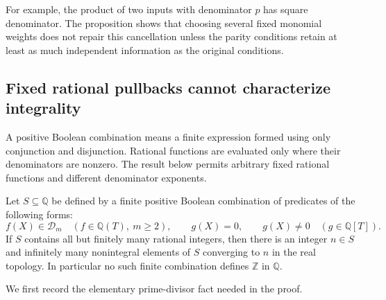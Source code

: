 For example, the product of two inputs with denominator $p$ has square
denominator.  The proposition shows that choosing several fixed
monomial weights does not repair this cancellation unless the parity
conditions retain at least as much independent information as the
original conditions.

\subsection{Fixed rational pullbacks cannot characterize integrality}

A positive Boolean combination means a finite expression formed using
only conjunction and disjunction.  Rational functions are evaluated
only where their denominators are nonzero.  The result below permits
arbitrary fixed rational functions and different denominator exponents.

\begin{theorem}\label{thm:finite-denominator-tests}
Let $S\subseteq\mathbb Q$ be defined by a finite positive Boolean
combination of predicates of the following forms:
\[
 f(X)\in\mathcal D_m\quad(f\in\mathbb Q(T),\ m\ge2),
 \qquad g(X)=0,\qquad g(X)\ne0
 \quad(g\in\mathbb Q[T]).
\]
If $S$ contains all but finitely many rational integers, then there is
an integer $n\in S$ and infinitely many nonintegral elements of $S$
converging to $n$ in the real topology.  In particular no such finite
combination defines $\mathbb Z$ in $\mathbb Q$.
\end{theorem}

We first record the elementary prime-divisor fact needed in the proof.

